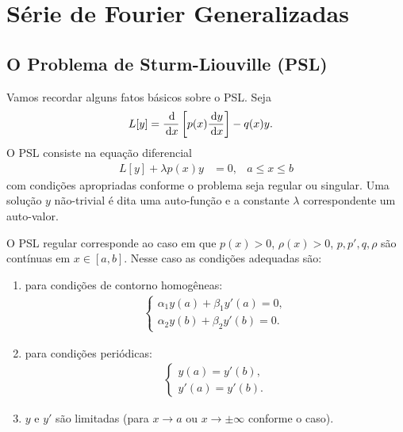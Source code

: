 % 
% 
% 
% 
% 
%
%
\chapter{Série de Fourier Generalizadas}
\section{O Problema de Sturm-Liouville (PSL)}
Vamos recordar alguns fatos básicos sobre o PSL. Seja
\begin{align*}
    L[y] &= \frac{\, \mathrm{d}}{\, \mathrm{d}x}\left[ p(x) \frac{\, \mathrm{d}y}{\, \mathrm{d}x} \right] - q(x) y.
\end{align*}
O PSL consiste na equação diferencial
\begin{align*}
    L[y] + \lambda p(x) y &= 0, & a \leq x \leq b
\end{align*}
com condições apropriadas conforme o problema seja regular ou singular. Uma solução $y$ não-trivial é dita uma auto-função e a constante $\lambda$ correspondente um auto-valor.

O PSL regular corresponde ao caso em que $p(x) > 0$, $\rho(x) > 0$, $p, p', q, \rho$ são contínuas em $x \in [a,b]$. Nesse caso as condições adequadas são:
\begin{enumerate}
    \item para condições de contorno homogêneas:
        \begin{align*}
            \begin{cases}
                \alpha_1 y(a) + \beta_1 y'(a) = 0, \\
                \alpha_2 y(b) + \beta_2 y'(b) = 0.
            \end{cases}
        \end{align*}
    \item para condições periódicas:
        \begin{align*}
            \begin{cases}
                y(a) = y'(b), \\
                y'(a) = y'(b).
            \end{cases}
        \end{align*}
    \item $y$ e $y'$ são limitadas (para $x \to a$ ou $x \to \pm \infty$ conforme o caso).
\end{enumerate}

